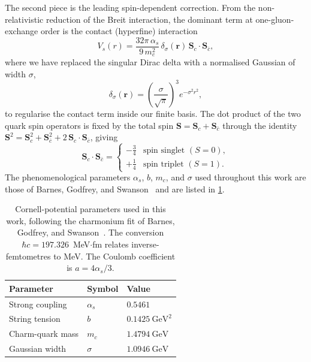The second piece is the leading spin-dependent
correction. From the non-relativistic reduction of the Breit interaction,
the dominant term at one-gluon-exchange order is the contact
(hyperfine) interaction~\cite{barnes2005,brambilla2011}
\begin{equation}
  \label{eq:hyperfine}
  V_s(r) =
    \frac{32\pi\,\alpha_s}{9\,m_c^{2}}\,
    \delta_\sigma(\mathbf{r})\,
    \mathbf{S}_c\cdot\mathbf{S}_{\bar c},
\end{equation}
where we have replaced the singular Dirac delta with a normalised Gaussian of
width $\sigma$,
\begin{equation}
  \label{eq:gaussian_delta}
  \delta_\sigma(\mathbf{r}) =
    \left(\frac{\sigma}{\sqrt{\pi}}\right)^{3} e^{-\sigma^{2} r^{2}},
\end{equation}
to regularise the contact term inside our finite basis. The dot product of
the two quark spin operators is fixed by the total spin
$\mathbf{S} = \mathbf{S}_c + \mathbf{S}_{\bar c}$ through the identity
$\mathbf{S}^{2} = \mathbf{S}_c^{2} + \mathbf{S}_{\bar c}^{2}
 + 2\,\mathbf{S}_c\cdot\mathbf{S}_{\bar c}$, giving
\begin{equation}
  \label{eq:spin_dot}
  \mathbf{S}_c\cdot\mathbf{S}_{\bar c} =
  \begin{cases}
    -\tfrac{3}{4} & \text{spin singlet } (S=0),\\[4pt]
    +\tfrac{1}{4} & \text{spin triplet } (S=1).
  \end{cases}
\end{equation}
The phenomenological parameters $\alpha_s$, $b$, $m_c$, and $\sigma$ used
throughout this work are those of Barnes, Godfrey, and
Swanson~\cite{barnes2005} and are listed in \cref{tab:cornell_params}.

\begin{table}[htbp]
\centering
\caption{Cornell-potential parameters used in this work, following the
  charmonium fit of Barnes, Godfrey, and Swanson~\cite{barnes2005}. The
  conversion $\hbar c = 197.326$~MeV$\cdot$fm relates inverse-femtometres to
  MeV. The Coulomb coefficient is $a = 4\alpha_s/3$.}
\label{tab:cornell_params}
\begin{tabular}{lll}
\toprule
Parameter & Symbol & Value \\
\midrule
Strong coupling          & $\alpha_s$    & $0.5461$ \\
String tension           & $b$           & $0.1425~\mathrm{GeV}^{2}$ \\
Charm-quark mass         & $m_c$         & $1.4794~\mathrm{GeV}$ \\
Gaussian width           & $\sigma$      & $1.0946~\mathrm{GeV}$ \\
\bottomrule
\end{tabular}
\end{table}

